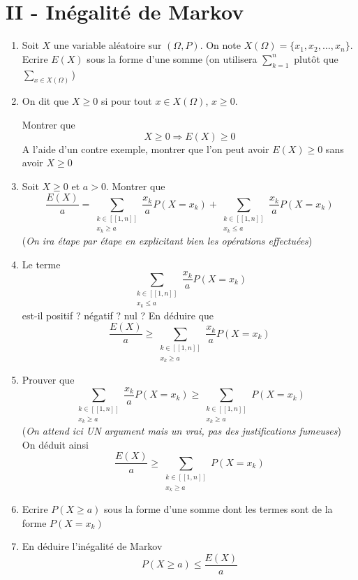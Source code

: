 \section*{II - Inégalité de Markov}
\begin{enumerate}
\item Soit $X$ une variable aléatoire sur $(\Omega,P)$. On note $X(\Omega) = \{x_1,x_2,\ldots,x_n\}$. Ecrire $E(X)$ sous la forme d'une somme (on utilisera $\sum_{k=1}^n$ plutôt que $\sum_{x\in X(\Omega)}$)
\item On dit que $X \geq 0$ si pour tout $x\in X(\Omega)$, $x\geq 0$.\newline

Montrer que 
$$\boxed{X \geq 0 \Rightarrow E(X) \geq 0}$$
A l'aide d'un contre exemple, montrer que l'on peut avoir $E(X) \geq 0$ sans avoir $X \geq 0$
\item Soit $X \geq 0$ et $a > 0$. Montrer que 
$$\boxed{\frac{E(X)}{a} = \sum_{\substack{k \in [ \![1,n]\!]\\x_k \geq a}} \frac{x_k}{a} P(X = x_k)+ \sum_{\substack{k \in [ \![1,n]\!]\\x_k \leq a}} \frac{x_k}{a} P(X = x_k)}$$
(\emph{On ira étape par étape en explicitant bien les opérations effectuées})
\item Le terme $$\sum_{\substack{k \in [ \![1,n]\!]\\x_k \leq a}} \frac{x_k}{a} P(X = x_k)$$ est-il positif ? négatif ? nul ? En déduire que $$\boxed{\frac{E(X)}{a} \geq \sum_{\substack{k \in [ \![1,n]\!]\\x_k \geq a}} \frac{x_k}{a} P(X = x_k)}$$
\item Prouver que 
$$\sum_{\substack{k \in [ \![1,n]\!]\\x_k \geq a}} \frac{x_k}{a} P(X = x_k) \geq \sum_{\substack{k \in [ \![1,n]\!]\\x_k \geq a}} P(X = x_k)$$
(\emph{On attend ici UN argument mais un vrai, pas des justifications fumeuses})
On déduit ainsi 
$$\boxed{\frac{E(X)}{a} \geq  \sum_{\substack{k \in [ \![1,n]\!]\\x_k \geq a}} P(X = x_k)}$$
\item Ecrire $P(X \geq a)$ sous la forme d'une somme dont les termes sont de la forme $P(X = x_k)$ 
\item En déduire l'inégalité de Markov $$\boxed{P(X \geq a)\leq \frac{E(X)}{a}}$$
\end{enumerate}
